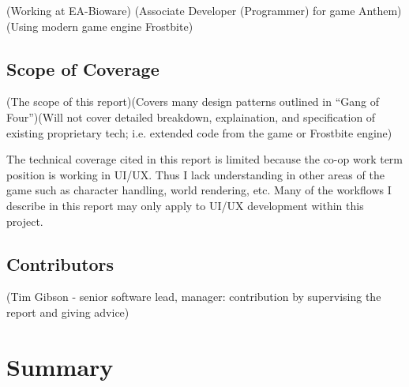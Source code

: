 \documentclass[10pt,letterpaper]{article}
\begin{document}
(Working at EA-Bioware)
(Associate Developer (Programmer) for game Anthem)
(Using modern game engine Frostbite)

\subsection*{Scope of Coverage}

(The scope of this report)(Covers many design patterns outlined in ``Gang of Four'')(Will not cover detailed breakdown, explaination, and specification of existing proprietary tech; i.e. extended code from the game or Frostbite engine)

The technical coverage cited in this report is limited because the co-op work term position is working in UI/UX. Thus I lack understanding in other areas of the game such as character handling, world rendering, etc. Many of the workflows I describe in this report may only apply to UI/UX development within this project.

\subsection*{Contributors}

(Tim Gibson - senior software lead, manager: contribution by supervising the report and giving advice) 

\newpage

\section*{Summary}
\newpage

\listoffigures
{}
\listoftables
{}
\newpage

\setcounter{page}{1}
\setcounter{section}{0}
\end{document}
